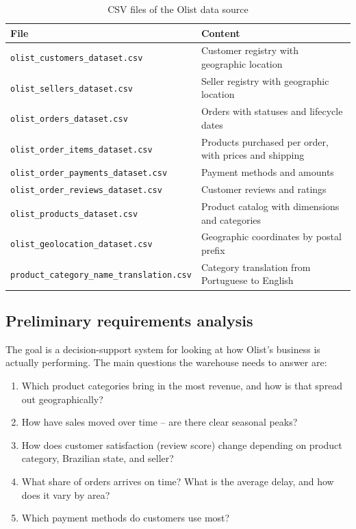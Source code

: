 \documentclass[12pt,a4paper]{article}
\begin{document}
\begin{table}[H]
  \centering
  \caption{CSV files of the Olist data source}
  \label{tab:csv}
  \begin{tabular}{ll}
    \toprule
    \textbf{File} & \textbf{Content} \\
    \midrule
    \texttt{olist\_customers\_dataset.csv}         & Customer registry with geographic location \\
    \texttt{olist\_sellers\_dataset.csv}            & Seller registry with geographic location \\
    \texttt{olist\_orders\_dataset.csv}             & Orders with statuses and lifecycle dates \\
    \texttt{olist\_order\_items\_dataset.csv}       & Products purchased per order, with prices and shipping \\
    \texttt{olist\_order\_payments\_dataset.csv}    & Payment methods and amounts \\
    \texttt{olist\_order\_reviews\_dataset.csv}     & Customer reviews and ratings \\
    \texttt{olist\_products\_dataset.csv}           & Product catalog with dimensions and categories \\
    \texttt{olist\_geolocation\_dataset.csv}        & Geographic coordinates by postal prefix \\
    \texttt{product\_category\_name\_translation.csv} & Category translation from Portuguese to English \\
    \bottomrule
  \end{tabular}
\end{table}

\subsection{Preliminary requirements analysis}

The goal is a decision-support system for looking at how Olist's business is actually
performing. The main questions the warehouse needs to answer are:

\begin{enumerate}
  \item Which product categories bring in the most revenue, and how is that spread out
        geographically?
  \item How have sales moved over time -- are there clear seasonal peaks?
  \item How does customer satisfaction (review score) change depending on product
        category, Brazilian state, and seller?
  \item What share of orders arrives on time? What is the average delay, and how does
        it vary by area?
  \item Which payment methods do customers use most?
\end{enumerate}
\end{document}
